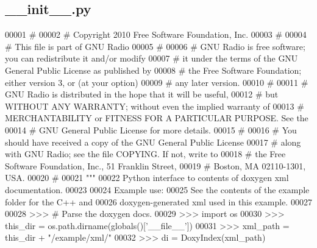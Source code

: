 \subsection{\+\_\+\+\_\+init\+\_\+\+\_\+.\+py}
\label{docs_2doxygen_2doxyxml_2____init_____8py_source}

\begin{DoxyCode}
00001 \textcolor{comment}{#}
00002 \textcolor{comment}{# Copyright 2010 Free Software Foundation, Inc.}
00003 \textcolor{comment}{#}
00004 \textcolor{comment}{# This file is part of GNU Radio}
00005 \textcolor{comment}{#}
00006 \textcolor{comment}{# GNU Radio is free software; you can redistribute it and/or modify}
00007 \textcolor{comment}{# it under the terms of the GNU General Public License as published by}
00008 \textcolor{comment}{# the Free Software Foundation; either version 3, or (at your option)}
00009 \textcolor{comment}{# any later version.}
00010 \textcolor{comment}{#}
00011 \textcolor{comment}{# GNU Radio is distributed in the hope that it will be useful,}
00012 \textcolor{comment}{# but WITHOUT ANY WARRANTY; without even the implied warranty of}
00013 \textcolor{comment}{# MERCHANTABILITY or FITNESS FOR A PARTICULAR PURPOSE.  See the}
00014 \textcolor{comment}{# GNU General Public License for more details.}
00015 \textcolor{comment}{#}
00016 \textcolor{comment}{# You should have received a copy of the GNU General Public License}
00017 \textcolor{comment}{# along with GNU Radio; see the file COPYING.  If not, write to}
00018 \textcolor{comment}{# the Free Software Foundation, Inc., 51 Franklin Street,}
00019 \textcolor{comment}{# Boston, MA 02110-1301, USA.}
00020 \textcolor{comment}{#}
00021 \textcolor{stringliteral}{"""}
00022 \textcolor{stringliteral}{Python interface to contents of doxygen xml documentation.}
00023 \textcolor{stringliteral}{}
00024 \textcolor{stringliteral}{Example use:}
00025 \textcolor{stringliteral}{See the contents of the example folder for the C++ and}
00026 \textcolor{stringliteral}{doxygen-generated xml used in this example.}
00027 \textcolor{stringliteral}{}
00028 \textcolor{stringliteral}{>>> # Parse the doxygen docs.}
00029 \textcolor{stringliteral}{>>> import os}
00030 \textcolor{stringliteral}{>>> this\_dir = os.path.dirname(globals()['\_\_file\_\_'])}
00031 \textcolor{stringliteral}{>>> xml\_path = this\_dir + "/example/xml/"}
00032 \textcolor{stringliteral}{>>> di = DoxyIndex(xml\_path)}

\end{DoxyCode}
